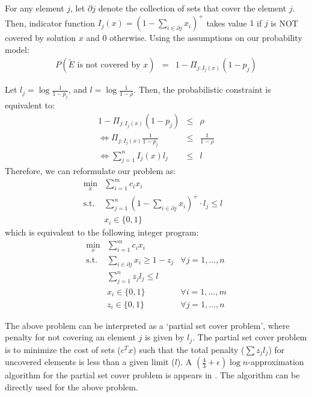 \documentclass[11pt,onecolumn]{article}
\begin{document}
For any element $j$, let $\partial{j}$ denote the collection of sets that cover the element $j$. Then, indicator function $I_j(x) = (1-\sum_{i\in \partial{j}} x_i)^+$ takes value $1$ if $j$ is NOT covered by solution $x$ and $0$ otherwise. 
Using the assumptions on our probability model:
\begin{eqnarray*}
P(\tilde{E} \textrm{ is not covered by } x) & = & 1-\Pi_{j:I_j(x)} (1-p_j)
\end{eqnarray*}

Let $l_j = \log{\frac{1}{1-p_j}}$, and $l=\log{\frac{1}{1-\rho}}$. Then, the probabilistic constraint is equivalent to:
\begin{eqnarray*}
\label{log-constraint}
1-\Pi_{j:I_j(x)} (1-p_j) & \le & \rho \nonumber\\
\Leftrightarrow \Pi_{j:I_j(x)} \frac{1}{1-p_j} & \le & \frac{1}{1-\rho}\nonumber\\
\Leftrightarrow \sum_{j=1}^n I_j(x) l_j & \le & l\nonumber
\end{eqnarray*}
Therefore, we can reformulate our problem as:
\begin{eqnarray*}
\min_{x} & \sum_{i=1}^m c_ix_i & \nonumber\\
\textrm{s.t. } & \sum_{j=1}^n  (1-\sum_{i\in \partial{j}} x_i)^+ \cdot l_j \le l & \nonumber\\
	& x_i \in \{0,1\}
\end{eqnarray*}
which is equivalent to the following integer program:
\begin{eqnarray}
\min_{x} & \sum_{i=1}^m c_ix_i & \nonumber\\
\textrm{s.t. } & \sum_{i\in \partial{j}} x_i \ge 1-z_j & \forall j=1,\ldots,n \nonumber\\
& \sum_{j=1}^n  z_jl_j \le l & \nonumber\\
	& x_i \in \{0,1\} & \forall i=1,\ldots,m \nonumber\\
	& z_i \in \{0,1\} & \forall j=1,\ldots,n \nonumber
\end{eqnarray}

The above problem can be interpreted as a `partial set cover problem', where penalty for not covering an element $j$ is given by $l_j$. The partial set cover problem is to minimize the cost of sets ($c^Tx$) such that the total penalty ($\sum z_jl_j$) for uncovered elements is less than a given limit ($l$). A $(\frac{4}{3}+\epsilon) \log n$-approximation algorithm for the partial set cover problem is appears in \cite{partialCover}. The algorithm can be directly used for the above problem. 
\end{document}
